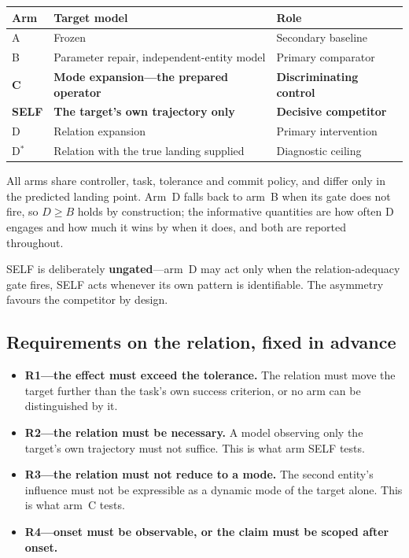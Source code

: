 \documentclass[10pt]{article}
\begin{document}
\begin{center}
\begin{tabular}{@{}lll@{}}
\toprule
Arm & Target model & Role \\
\midrule
A & Frozen & Secondary baseline \\
B & Parameter repair, independent-entity model & Primary comparator \\
\textbf{C} & \textbf{Mode expansion---the prepared operator} & \textbf{Discriminating control} \\
\textbf{SELF} & \textbf{The target's own trajectory only} & \textbf{Decisive competitor} \\
D & Relation expansion & Primary intervention \\
D\(^{*}\) & Relation with the true landing supplied & Diagnostic ceiling \\
\bottomrule
\end{tabular}
\end{center}

All arms share controller, task, tolerance and commit policy, and differ only in
the predicted landing point. Arm~D falls back to arm~B when its gate does not
fire, so \(D \geq B\) holds by construction; the informative quantities are how
often D engages and how much it wins by when it does, and both are reported
throughout.

SELF is deliberately \textbf{ungated}---arm~D may act only when the
relation-adequacy gate fires, SELF acts whenever its own pattern is identifiable.
The asymmetry favours the competitor by design.

\subsection{Requirements on the relation, fixed in advance}
\label{sec:requirements}

\begin{itemize}[leftmargin=*]
\item \textbf{R1---the effect must exceed the tolerance.} The relation must move
the target further than the task's own success criterion, or no arm can be
distinguished by it.
\item \textbf{R2---the relation must be necessary.} A model observing only the
target's own trajectory must not suffice. This is what arm SELF tests.
\item \textbf{R3---the relation must not reduce to a mode.} The second entity's
influence must not be expressible as a dynamic mode of the target alone. This is
what arm~C tests.
\item \textbf{R4---onset must be observable, or the claim must be scoped after
onset.}
\end{itemize}
\end{document}
